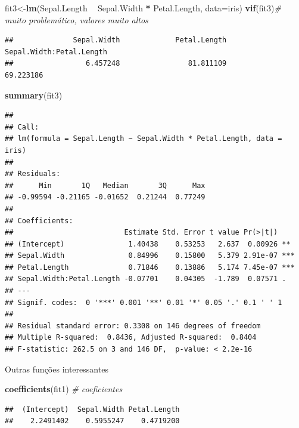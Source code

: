 \documentclass[
]{book}
\newenvironment{Shaded}{\begin{snugshade}}{\end{snugshade}}
\newcommand{\CommentTok}[1]{\textcolor[rgb]{0.56,0.35,0.01}{\textit{#1}}}
\newcommand{\DataTypeTok}[1]{\textcolor[rgb]{0.13,0.29,0.53}{#1}}
\newcommand{\KeywordTok}[1]{\textcolor[rgb]{0.13,0.29,0.53}{\textbf{#1}}}
\newcommand{\NormalTok}[1]{#1}
\newcommand{\OperatorTok}[1]{\textcolor[rgb]{0.81,0.36,0.00}{\textbf{#1}}}
\newcommand{\StringTok}[1]{\textcolor[rgb]{0.31,0.60,0.02}{#1}}
\begin{document}
\begin{Shaded}
\begin{Highlighting}[]
\NormalTok{fit3<-}\KeywordTok{lm}\NormalTok{(Sepal.Length }\OperatorTok{~}\StringTok{ }\NormalTok{Sepal.Width }\OperatorTok{*}\StringTok{ }\NormalTok{Petal.Length, }\DataTypeTok{data=}\NormalTok{iris)}
\KeywordTok{vif}\NormalTok{(fit3)}\CommentTok{# muito problemático, valores muito altos}
\end{Highlighting}
\end{Shaded}

\begin{verbatim}
##              Sepal.Width             Petal.Length Sepal.Width:Petal.Length 
##                 6.457248                81.811109                69.223186
\end{verbatim}

\begin{Shaded}
\begin{Highlighting}[]
\KeywordTok{summary}\NormalTok{(fit3)}
\end{Highlighting}
\end{Shaded}

\begin{verbatim}
## 
## Call:
## lm(formula = Sepal.Length ~ Sepal.Width * Petal.Length, data = iris)
## 
## Residuals:
##      Min       1Q   Median       3Q      Max 
## -0.99594 -0.21165 -0.01652  0.21244  0.77249 
## 
## Coefficients:
##                          Estimate Std. Error t value Pr(>|t|)    
## (Intercept)               1.40438    0.53253   2.637  0.00926 ** 
## Sepal.Width               0.84996    0.15800   5.379 2.91e-07 ***
## Petal.Length              0.71846    0.13886   5.174 7.45e-07 ***
## Sepal.Width:Petal.Length -0.07701    0.04305  -1.789  0.07571 .  
## ---
## Signif. codes:  0 '***' 0.001 '**' 0.01 '*' 0.05 '.' 0.1 ' ' 1
## 
## Residual standard error: 0.3308 on 146 degrees of freedom
## Multiple R-squared:  0.8436, Adjusted R-squared:  0.8404 
## F-statistic: 262.5 on 3 and 146 DF,  p-value: < 2.2e-16
\end{verbatim}

Outras funções interessantes

\begin{Shaded}
\begin{Highlighting}[]
\KeywordTok{coefficients}\NormalTok{(fit1) }\CommentTok{# coeficientes}
\end{Highlighting}
\end{Shaded}

\begin{verbatim}
##  (Intercept)  Sepal.Width Petal.Length 
##    2.2491402    0.5955247    0.4719200
\end{verbatim}
\end{document}
